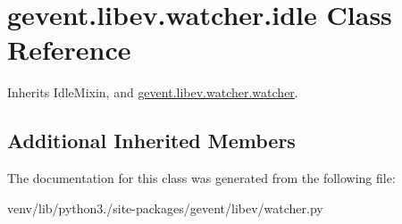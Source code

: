 \hypertarget{classgevent_1_1libev_1_1watcher_1_1idle}{}\section{gevent.\+libev.\+watcher.\+idle Class Reference}
\label{classgevent_1_1libev_1_1watcher_1_1idle}


Inherits Idle\+Mixin, and \hyperlink{classgevent_1_1libev_1_1watcher_1_1watcher}{gevent.\+libev.\+watcher.\+watcher}.

\subsection*{Additional Inherited Members}


The documentation for this class was generated from the following file\+:\begin{DoxyCompactItemize}
\item 
venv/lib/python3./site-\/packages/gevent/libev/watcher.\+py\end{DoxyCompactItemize}
